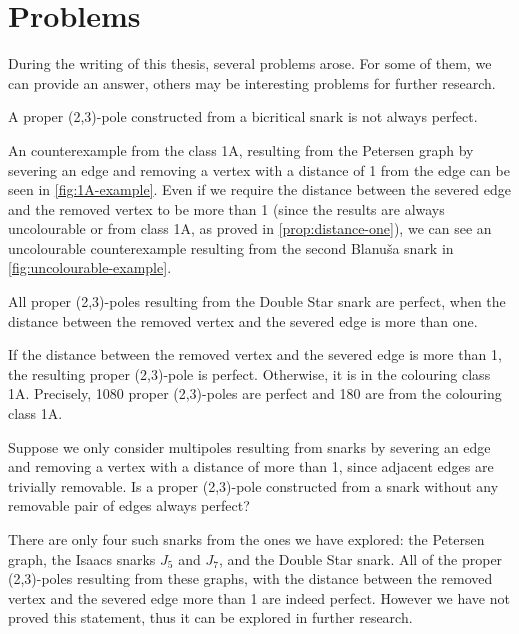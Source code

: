 \section{Problems}\label{sec:problems}

During the writing of this thesis, several problems arose. For some of them, we can provide an answer, others may be interesting problems for further research.

\begin{claim}
	A proper (2,3)-pole constructed from a bicritical snark is not always perfect.
\end{claim}

An counterexample from the class 1A, resulting from the Petersen graph by severing an edge and removing a vertex with a distance of 1 from the edge can be seen in \cref{fig:1A-example}. Even if we require the distance between the severed edge and the removed vertex to be more than 1 (since the results are always uncolourable or from class 1A, as proved in \cref{prop:distance-one}), we can see an uncolourable counterexample resulting from the second Blanuša snark in \cref{fig:uncolourable-example}.

\begin{claim}
	All proper (2,3)-poles resulting from the Double Star snark are perfect, when the distance between the removed vertex and the severed edge is more than one.
\end{claim}

If the distance between the removed vertex and the severed edge is more than 1, the resulting proper (2,3)-pole is perfect. Otherwise, it is in the colouring class 1A. Precisely, 1080 proper (2,3)-poles are perfect and 180 are from the colouring class 1A.

\begin{problem}
	Suppose we only consider multipoles resulting from snarks by severing an edge and removing a vertex with a distance of more than 1, since adjacent edges are trivially removable. Is a proper (2,3)-pole constructed from a snark without any removable pair of edges always perfect?
\end{problem}

There are only four such snarks from the ones we have explored: the Petersen graph, the Isaacs snarks $J_5$ and $J_7$, and the Double Star snark. All of the proper (2,3)-poles resulting from these graphs, with the distance between the removed vertex and the severed edge more than 1 are indeed perfect. However we have not proved this statement, thus it can be explored in further research.

